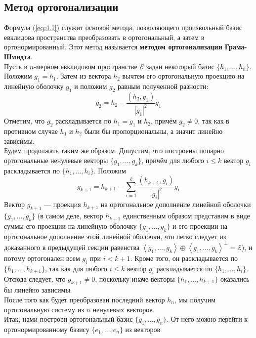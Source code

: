 \documentclass[11pt]{article}
\begin{document}
\subsection{Метод ортогонализации}

Формула (\ref{eq:4.1}) служит основой метода, позволяющего произвольный базис евклидова пространства преобразовать в ортогональный, а затем в ортонормированный. Этот метод называется \textbf{методом ортогонализации Грама-Шмидта}. \\
Пусть в $n$-мерном евклидовом пространстве $\mathcal{E}$ задан некоторый базис $\{h_1, \ldots, h_n\}$. Положим $g_1 = h_1$. Затем из вектора $h_2$ вычтем его ортогональную проекцию на линейную оболочку $g_1$ и положим $g_2$ равным полученной разности:
\[g_2 = h_2 - \frac{(h_2, g_1)}{\left\lvert g_1 \right\rvert^2} g_1\]
Отметим, что $g_2$ раскладывается по $h_1 = g_1$ и $h_2$, причём $g_2 \neq 0$, так как в противном случае $h_1$ и $h_2$ были бы пропорциональны, а значит линейно зависимы. \\
Будем продолжать таким же образом. Допустим, что построены попарно ортогональные ненулевые векторы $\{g_1, \ldots, g_k\}$, причём для любого $i \leq k$ вектор $g_i$ раскладывается по $\{h_1, \ldots, h_i\}$. Положим
\begin{equation} \label{eq:5.1}
    g_{k + 1} = h_{k + 1} - \sum_{i = 1}^k \frac{(h_{k + 1}, g_i)}{\left\lvert g_i \right\rvert^2} g_i
\end{equation}
Вектор $g_{k + 1}$ --- проекция $h_{k + 1}$ на ортогональное дополнение линейной оболочки $\{g_1, \ldots, g_k\}$ (в самом деле, вектор $h_{k + 1}$ единственным образом представим в виде суммы его проекции на линейную оболочку $\{g_1, \ldots, g_k\}$ и его проекции на ортогональное дополнение этой линейной оболочки, что легко следует из доказанного в предыдущей секции равенства $\left\langle g_1, \ldots, g_k \right\rangle \oplus \left\langle g_1, \ldots, g_k \right\rangle^{\perp} = \mathcal{E}$), и потому ортогонален всем $g_i$ при $i < k + 1$. Кроме того, он раскладывается по $\{h_1, \ldots, h_{k + 1}\}$, так как для любого $i \leq k$ вектор $g_i$ раскладывается по $\{h_1, \ldots, h_i\}$. Отсюда следует, что $g_{k + 1} \neq 0$, поскольку иначе векторы $\{h_1, \ldots, h_{k + 1}\}$ оказались бы линейно зависимы. \\
После того как будет преобразован последний вектор $h_n$, мы получим ортогональную систему из $n$ ненулевых векторов. \\
Итак, нами построен ортогональный базис $\{g_1, \ldots, g_n\}$. От него можно перейти к ортонормированному базису $\{e_1, \ldots, e_n\}$ из векторов 
\end{document}
